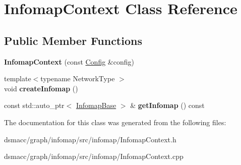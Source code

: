 \hypertarget{classInfomapContext}{}\section{Infomap\+Context Class Reference}
\label{classInfomapContext}
\subsection*{Public Member Functions}
\begin{DoxyCompactItemize}
\item 
\mbox{\label{classInfomapContext_aeb5ae8526bb4025b6d35931c1599e90e}} 
{\bfseries Infomap\+Context} (const \mbox{\hyperlink{structConfig}{Config}} \&config)
\item 
\mbox{\label{classInfomapContext_a3d15288285d7f72f4488f98ba11c3e1a}} 
{\footnotesize template$<$typename Network\+Type $>$ }\\void {\bfseries create\+Infomap} ()
\item 
\mbox{\label{classInfomapContext_ad995c01e04280bd27ad0c28ecd2af9b4}} 
const std\+::auto\+\_\+ptr$<$ \mbox{\hyperlink{classInfomapBase}{Infomap\+Base}} $>$ \& {\bfseries get\+Infomap} () const
\end{DoxyCompactItemize}


The documentation for this class was generated from the following files\+:\begin{DoxyCompactItemize}
\item 
dsmacc/graph/infomap/src/infomap/Infomap\+Context.\+h\item 
dsmacc/graph/infomap/src/infomap/Infomap\+Context.\+cpp\end{DoxyCompactItemize}

